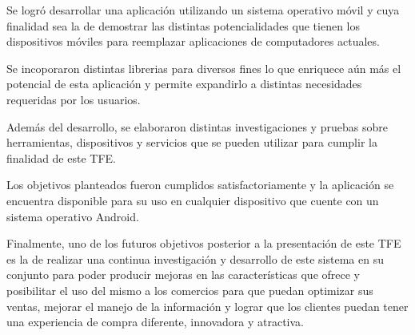 
Se logr\'o desarrollar una aplicaci\'on utilizando un sistema operativo m\'ovil y cuya finalidad sea la de demostrar las distintas potencialidades que tienen los dispositivos m\'oviles para reemplazar aplicaciones de computadores actuales.

Se incoporaron distintas librerias para diversos fines lo que enriquece a\'un m\'as el potencial de esta aplicaci\'on y permite expandirlo a distintas necesidades requeridas por los usuarios.

Adem\'as del desarrollo, se elaboraron distintas investigaciones y pruebas sobre herramientas, dispositivos y servicios que se pueden utilizar para cumplir la finalidad de este \ac{TFE}.

Los objetivos planteados fueron cumplidos satisfactoriamente y la aplicaci\'on se encuentra disponible para su uso en cualquier dispositivo que cuente con un sistema operativo Android.

Finalmente, uno de los futuros objetivos posterior a la presentaci\'on de este \ac{TFE} es la de realizar una continua investigaci\'on y desarrollo de este sistema en su conjunto para poder producir mejoras en las caracter\'isticas que ofrece y posibilitar el uso del mismo a los comercios para que puedan optimizar sus ventas, mejorar el manejo de la informaci\'on y lograr que los clientes puedan tener una experiencia de compra diferente, innovadora y atractiva.
